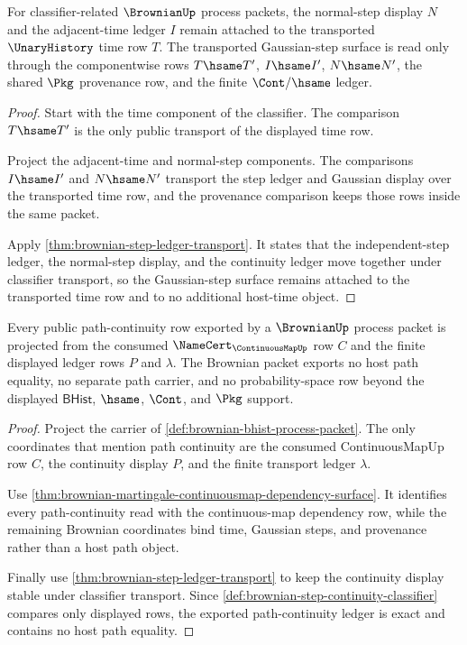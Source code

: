 \begin{theorem}
\label{thm:brownian-gaussian-step-classifier-stability}
For classifier-related $\BrownianUp$ process packets, the normal-step display
$N$ and the adjacent-time ledger $I$ remain attached to the transported
$\UnaryHistory$ time row $T$. The transported Gaussian-step surface is read
only through the componentwise rows $T\hsame T'$, $I\hsame I'$,
$N\hsame N'$, the shared $\Pkg$ provenance row, and the finite
$\Cont/\hsame$ ledger.
\end{theorem}
\begin{proof}
Start with the time component of the classifier. The comparison
$T\hsame T'$ is the only public transport of the displayed time row.

Project the adjacent-time and normal-step components. The comparisons
$I\hsame I'$ and $N\hsame N'$ transport the step ledger and Gaussian display
over the transported time row, and the provenance comparison keeps those rows
inside the same packet.

Apply \autoref{thm:brownian-step-ledger-transport}. It states that the
independent-step ledger, the normal-step display, and the continuity ledger
move together under classifier transport, so the Gaussian-step surface remains
attached to the transported time row and to no additional host-time object.
\end{proof}

\begin{theorem}
\label{thm:brownian-path-continuity-ledger-exactness}
Every public path-continuity row exported by a $\BrownianUp$ process packet is
projected from the consumed $\NameCert_{\ContinuousMapUp}$ row $C$ and the
finite displayed ledger rows $P$ and $\lambda$. The Brownian packet exports no
host path equality, no separate path carrier, and no probability-space row
beyond the displayed $\mathsf{BHist}$, $\hsame$, $\Cont$, and $\Pkg$ support.
\end{theorem}
\begin{proof}
Project the carrier of \autoref{def:brownian-bhist-process-packet}. The only
coordinates that mention path continuity are the consumed ContinuousMapUp row
$C$, the continuity display $P$, and the finite transport ledger $\lambda$.

Use \autoref{thm:brownian-martingale-continuousmap-dependency-surface}. It
identifies every path-continuity read with the continuous-map dependency row,
while the remaining Brownian coordinates bind time, Gaussian steps, and
provenance rather than a host path object.

Finally use \autoref{thm:brownian-step-ledger-transport} to keep the
continuity display stable under classifier transport. Since
\autoref{def:brownian-step-continuity-classifier} compares only displayed
rows, the exported path-continuity ledger is exact and contains no host path
equality.
\end{proof}

